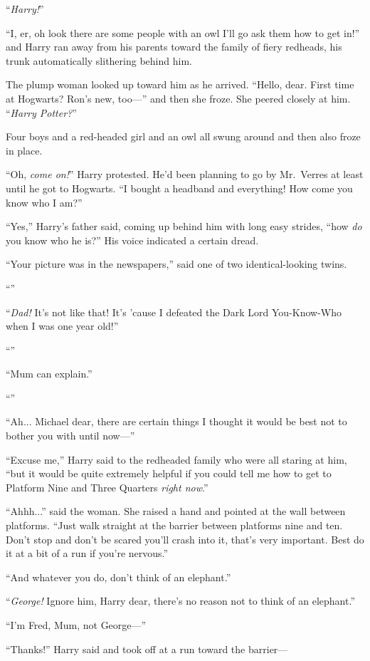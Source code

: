 “\emph{Harry!}”

“I, er, oh look there are some people with an owl I’ll go ask them how to get in!” and Harry ran away from his parents toward the family of fiery redheads, his trunk automatically slithering behind him.

The plump woman looked up toward him as he arrived. “Hello, dear. First time at Hogwarts? Ron’s new, too—” and then she froze. She peered closely at him. “\emph{Harry Potter?}”

Four boys and a red-headed girl and an owl all swung around and then also froze in place.

“Oh, \emph{come on!}” Harry protested. He’d been planning to go by Mr.~Verres at least until he got to Hogwarts. “I bought a headband and everything! How come you know who I am?”

“Yes,” Harry’s father said, coming up behind him with long easy strides, “how \emph{do} you know who he is?” His voice indicated a certain dread.

“Your picture was in the newspapers,” said one of two identical-looking twins.

“”

“\emph{Dad!} It’s not like that! It’s ’cause I defeated the Dark Lord You-Know-Who when I was one year old!”

“”

“Mum can explain.”

“”

“Ah... Michael dear, there are certain things I thought it would be best not to bother you with until now—”

“Excuse me,” Harry said to the redheaded family who were all staring at him, “but it would be quite extremely helpful if you could tell me how to get to Platform Nine and Three Quarters \emph{right now}.”

“Ahhh...” said the woman. She raised a hand and pointed at the wall between platforms. “Just walk straight at the barrier between platforms nine and ten. Don’t stop and don’t be scared you’ll crash into it, that’s very important. Best do it at a bit of a run if you’re nervous.”

“And whatever you do, don’t think of an elephant.”

“\emph{George!} Ignore him, Harry dear, there’s no reason not to think of an elephant.”

“I’m Fred, Mum, not George—”

“Thanks!” Harry said and took off at a run toward the barrier—

